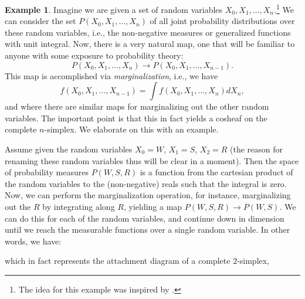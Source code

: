 \documentclass[a4paper]{book}
\theoremstyle{definition}
\newtheorem{example}{Example}[section]
\theoremstyle{definition}
\theoremstyle{definition}
\theoremstyle{theorem}
\theoremstyle{definition}
\begin{document}
\begin{example}  
Imagine we are given a set of random variables $X_0, X_1, \dots, X_n$.\footnote{The idea for this example was inspired by \cite{robinson_sheaf_2016}.} We can consider the set $P(X_0, X_1,\dots, X_n)$ of all joint probability distributions over these random variables, i.e., the non-negative measures or generalized functions with unit integral. Now, there is a very natural map, one that will be familiar to anyone with some exposure to probability theory: 
\begin{equation}
P(X_0, X_1, \dots, X_n) \rightarrow P(X_0, X_1, \dots, X_{n-1}).
\end{equation}
This map is accomplished via \textit{marginalization}, i.e., we have 
\begin{equation}
f(X_0, X_1,\dots, X_{n-1}) = \int f(X_0, X_1, \dots, X_n) d X_n,
\end{equation}
and where there are similar maps for marginalizing out the other random variables. The important point is that this in fact yields a cosheaf on the complete $n$-simplex. We elaborate on this with an example. \par 
Assume given the random variables $X_0 = W$, $X_1 = S$, $X_2 = R$ (the reason for renaming these random variables thus will be clear in a moment). Then the space of probability measures $P(W,S,R)$ is a function from the cartesian product of the random variables to the (non-negative) reals such that the integral is zero. Now, we can perform the marginalization operation, for instance, marginalizing out the $R$ by integrating along $R$, yielding a map $P(W,S,R) \rightarrow P(W,S)$. We can do this for each of the random variables, and continue down in dimension until we reach the measurable functions over a single random variable. In other words, we have: 
	\begin{center} 
	\small
\end{center} 
which in fact represents the attachment diagram of a complete $2$-simplex, 
\begin{center} 
\begin{tikzpicture}


\end{tikzpicture}
\end{center}
\end{example}
\end{document}

